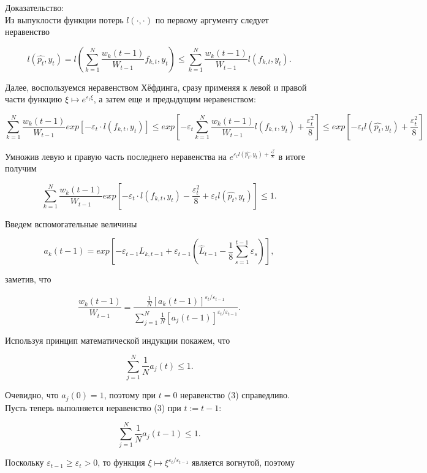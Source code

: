 \documentclass{article}
\begin{document}
Доказательство: \\

Из выпуклости функции потерь $l(\cdot, \cdot)$ по первому аргументу следует неравенство

\[ 
l(\hat{p_t}, y_t) = l(\sum^N_{k=1} \frac{w_k(t-1)}{W_{t-1}} f_{k,t}, y_t) \le \sum^N_{k=1} \frac{w_k(t-1)}{W_{t-1}} l(f_{k,t}, y_t). 
\]

Далее, воспользуемся неравенством Хёфдинга, сразу применяя к левой и правой части функцию $\xi \mapsto e^{\varepsilon_t \xi}$, а затем еще и предыдущим неравенством:

\[ 
\sum^N_{k=1} \frac{w_k(t-1)}{W_{t-1}} exp[-\varepsilon_t \cdot l(f_{k,t}, y_t)] \le 
exp[ - \varepsilon_t \sum^N_{k=1} \frac{w_k(t-1)}{W_{t-1}} l(f_{k,t}, y_t) + \frac{\varepsilon^2_t}{8} ] \le
exp[-\varepsilon_t l(\hat{p_t}, y_t) + \frac{\varepsilon^2_t}{8}]
\]

Умножив левую и правую часть последнего неравенства на $ e^{\varepsilon_t l(\hat{p_t}, y_t) + \frac{\varepsilon^2_t}{8}}$ в итоге получим

\begin{equation}
\sum^N_{k=1} \frac{w_k(t-1)}{W_{t-1}} exp[-\varepsilon_t \cdot l(f_{k,t}, y_t) - \frac{\varepsilon^2_t}{8} + \varepsilon_t l(\hat{p_t}, y_t) ] \le 1.
\end{equation}

Введем вспомогательные величины

\[  
a_k(t-1) = exp[ -\varepsilon_{t-1} L_{k,t-1} + \varepsilon_{t-1} (\hat{L}_{t-1} - \frac{1}{8} \sum^{t-1}_{s=1} \varepsilon_s)],
\]

заметив, что 

\begin{equation}
\frac{w_k(t-1)}{W_{t-1}} = \frac{ \frac{1}{N} [a_k(t-1)]^{\varepsilon_t / \varepsilon_{t-1}} }{ \sum^N_{j=1} \frac{1}{N} [a_j(t - 1)]^{\varepsilon_t / \varepsilon_{t-1}} }.
\end{equation}

Используя принцип математической индукции покажем, что

\begin{equation}
\sum^N_{j=1} \frac{1}{N} a_j(t) \le 1.
\end{equation}

Очевидно, что $a_j (0) = 1$, поэтому при $t = 0$ неравенство (3) справедливо. Пусть теперь выполняется неравенство (3) при $t := t - 1$:

\[ 
\sum^N_{j=1} \frac{1}{N} a_j(t-1) \le 1.
\]

Поскольку $\varepsilon_{t-1} \ge \varepsilon_t > 0$, то функция $\xi \mapsto \xi^{\varepsilon_t / \varepsilon_{t-1}}$ является вогнутой, поэтому 
\end{document}
